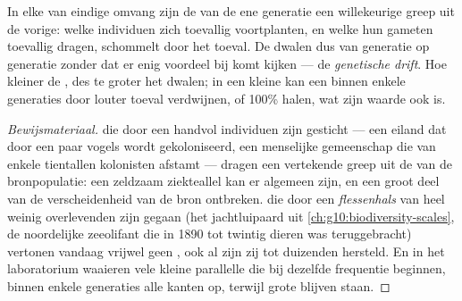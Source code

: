 \begin{proposition}\label{prop:g12:selection-drift-speciation:drift}
In elke  van eindige omvang zijn de  van de ene generatie
een willekeurige greep uit de vorige: welke individuen zich toevallig
voortplanten, en welke  hun gameten toevallig dragen, schommelt
door het toeval. De  dwalen dus van generatie op generatie
zonder dat er enig voordeel bij komt kijken --- de \emph{genetische
drift}. Hoe kleiner de , des te groter
het dwalen; in een kleine  kan een  binnen enkele
generaties door louter toeval verdwijnen, of 100\% halen, wat zijn waarde
ook is.
\end{proposition}
\begin{proof}[Bewijsmateriaal]
 die door een handvol individuen zijn gesticht --- een eiland
dat door een paar vogels wordt gekoloniseerd, een menselijke gemeenschap
die van enkele tientallen kolonisten afstamt --- dragen een vertekende
greep uit de  van de bronpopulatie: een zeldzaam ziekteallel kan er
algemeen zijn, en een groot deel van de verscheidenheid van de bron
ontbreken.  die door een \emph{flessenhals} van heel weinig
overlevenden zijn gegaan (het jachtluipaard uit
\cref{ch:g10:biodiversity-scales}, de noordelijke zeeolifant die in 1890
tot twintig dieren was teruggebracht) vertonen vandaag vrijwel geen
, ook al zijn zij tot duizenden hersteld. En in het
laboratorium waaieren vele kleine parallelle  die bij dezelfde
frequentie beginnen, binnen enkele generaties alle kanten op, terwijl
grote blijven staan.
\end{proof}

